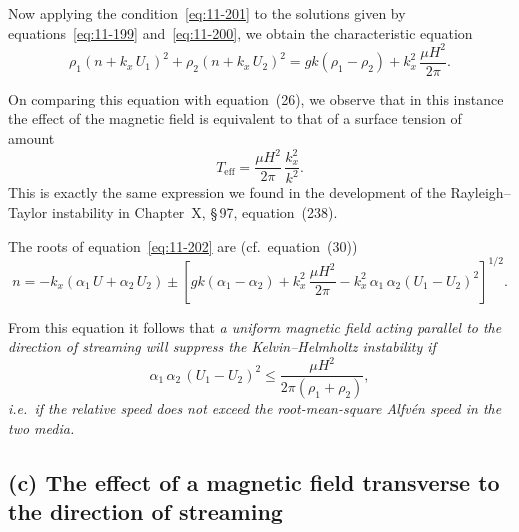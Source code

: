 Now applying the condition~\eqref{eq:11-201} to the solutions given by
equations~\eqref{eq:11-199} and~\eqref{eq:11-200}, we obtain the
characteristic equation
\begin{equation}
\label{eq:11-202}
\rho_1(n+k_x\,U_1)^{2}+\rho_2(n+k_x\,U_2)^{2}
= gk(\rho_1-\rho_2)+k_x^{2}\,\frac{\mu H^{2}}{2\pi}.
\end{equation}

On comparing this equation with equation~(26), we observe that in this
instance the effect of the magnetic field is equivalent to that of a
surface tension of amount
\begin{equation}
\label{eq:11-203}
T_{\text{eff}} = \frac{\mu H^{2}}{2\pi}\,\frac{k_x^{2}}{k^{2}}.
\end{equation}
This is exactly the same expression we found in the development of the
Rayleigh--Taylor instability in Chapter~X, \S\,97, equation~(238).

The roots of equation~\eqref{eq:11-202} are (cf.\ equation~(30))
\begin{equation}
\label{eq:11-204}
n = -k_x(\alpha_1\,U + \alpha_2\,U_2) \pm
\left[gk(\alpha_1-\alpha_2) + k_x^{2}\,\frac{\mu H^{2}}{2\pi}
  - k_x^{2}\,\alpha_1\,\alpha_2(U_1-U_2)^{2}\right]^{1/2}\!.
\end{equation}

From this equation it follows that \textit{a uniform magnetic field acting
parallel to the direction of streaming will suppress the
Kelvin--Helmholtz instability if}
\begin{equation}
\label{eq:11-205}
\alpha_1\,\alpha_2\,(U_1-U_2)^{2}
\leqslant \frac{\mu H^{2}}{2\pi(\rho_1+\rho_2)},
\end{equation}
\textit{i.e.\ if the relative speed does not exceed the root-mean-square
Alfv\'en speed in the two media.}

\subsection*{(c) The effect of a magnetic field transverse to the
  direction of streaming}

